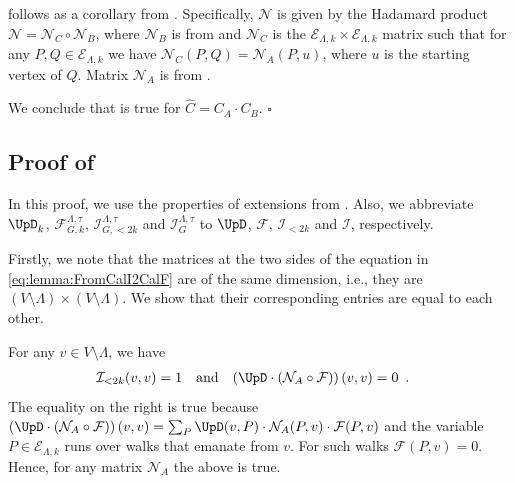\documentclass[11pt,reqno]{amsart}
\numberwithin{equation}{section}
\newcommand{\cE}{{\mathcal{E}}}
\newcommand{\cF}{{\mathcal{F}}}
\newcommand{\cI}{{\mathcal{I}}}
\newcommand{\cN}{{\mathcal{N}}}
\newcommand{\amethyst}[1]{{\color{amethyst}#1} }
\newcommand{\bluepigment}[1]{{\color{blue(pigment)}#1}}
\newcommand{\deeppink}[1]{{\color{deeppink}#1}}
\newcommand{\electricviolet}[1]{{\color{electricviolet}#1}}
\newcommand{\goldenbrown}[1]{{\color{goldenbrown}#1}}
\newcommand{\iris}[1]{{\color{iris}#1}}
\newcommand{\red}[1]{{\color{red}#1}}
\newcommand{\ExtV}{\iris{\cE}}
\newcommand{\infmatrix}{\cI}
\newcommand{\VToEdge}{\UpD}
\renewcommand{\amethyst}[1]{#1}
\renewcommand{\bluepigment}[1]{#1}
\renewcommand{\deeppink}[1]{#1}
\renewcommand{\electricviolet}[1]{#1}
\renewcommand{\goldenbrown}[1]{#1}
\renewcommand{\iris}[1]{#1}
\renewcommand{\red}[1]{#1}
\newcommand{\kC}{\deeppink{C}}
\newcommand{\kk}{\bluepigment{k}}
\newcommand{\kP}{\goldenbrown{P}}
\newcommand{\kQ}{\amethyst{Q}}
\newcommand{\ku}{\red{u}}
\newcommand{\kv}{\electricviolet{v}}
\renewcommand{\kC}{C}
\renewcommand{\kk}{k}
\renewcommand{\kP}{P}
\renewcommand{\kQ}{Q}
\renewcommand{\ku}{u}
\renewcommand{\kv}{v}
\newcommand{\SemExtdInfMatrix}{\cF}
\newcommand{\SymWeightM}{\cN}
\newcommand{\SymWeightMA}{\cN_A}
\newcommand{\SymWeightMB}{\cN_B}
\begin{document}
  follows as a corollary from . 
Specifically, %
$\SymWeightM$ is given by the Hadamard product $\SymWeightM=\SymWeightM_C \circ\SymWeightMB$,
where $\SymWeightMB$ is from  and $\SymWeightM_C$ is the $\ExtV_{\Lambda,k}\times \ExtV_{\Lambda,\kk}$ matrix such that 
for any $\kP,\kQ\in \ExtV_{\Lambda,\kk}$ we have $\SymWeightM_C(\kP,\kQ)=\SymWeightMA(\kP,\ku)$,
where $\ku$ is the starting vertex of $\kQ$. Matrix $\SymWeightMA$ is from  .

We conclude that  is true for $\widehat{\kC}=C_A\cdot C_B$. 
%
\hfill $\square$ 



\subsection{Proof of }\label{sec:lemma:FromCalI2CalF}
% 
In this proof,  we use the properties of extensions from . 
Also, we abbreviate $\VToEdge_{\kk}$, $\SemExtdInfMatrix^{\Lambda,\tau}_{G,k}$,
 $\infmatrix^{\Lambda,\tau}_{G, <2\kk}$ and $\infmatrix^{\Lambda,\tau}_{G}$ to 
 $ \VToEdge$, $\SemExtdInfMatrix$, $\infmatrix_{<2\kk}$ and $\infmatrix$, respectively. 

Firstly, we note that the matrices at the two sides of the equation in \eqref{eq:lemma:FromCalI2CalF} are of the same dimension, 
i.e., they are $(V\setminus \Lambda)\times (V\setminus \Lambda)$. 
%
We show that their corresponding entries are equal to each other. 




For any $\kv\in V\setminus \Lambda$, we have
% 
\begin{align}\label{eq:FirstEqInlemma:FromCalI2CalF}
\infmatrix_{<2{\kk}}(\kv,\kv)&=1& \textrm{and}&& \left(\VToEdge\cdot \left(\SymWeightMA \circ\SemExtdInfMatrix \right)\right)(\kv,\kv)&=0 \enspace. 
\end{align}
The equality on the right is true because $\left(\VToEdge\cdot \left(\SymWeightMA \circ\SemExtdInfMatrix \right)\right)(\kv,\kv)=\sum_{\kP}\VToEdge(\kv,\kP)\cdot\SymWeightMA(\kP,\kv)\cdot \SemExtdInfMatrix(\kP,\kv)$
and the variable $\kP\in \ExtV_{\Lambda,\kk}$ runs over walks that emanate from $\kv$. For such walks $\SemExtdInfMatrix(\kP,\kv)=0$. Hence, 
for any matrix $\SymWeightMA$ the above is true. 
\end{document}
